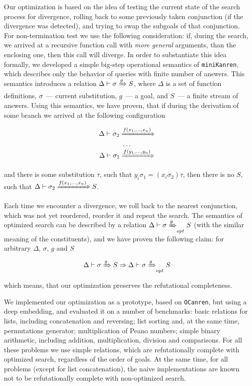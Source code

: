 \documentclass[preprint,numbers,10pt]{sigplanconf}
\newcommand{\miniKanren}{\texttt{miniKanren}\xspace}
\newcommand{\ocanren}{\texttt{OCanren}\xspace}
\begin{document}
Our optimization is based on the idea of testing the current state of the search process for divergence, rolling back to some previously taken conjunction
(if the divergence was detected), and trying to swap the subgoals of that conjunction. For non-termination test we use the following consideration: if, during
the search, we arrived at a recursive function call with \emph{more general} arguments, than the enclosing one, then this call will diverge. In order to substantiate
this idea formally, we developed a simple big-step operational semantics of \miniKanren, which describes only the behavior of queries with finite number of answers.
This semantics introduces a relation $\Delta\vdash\sigma\xRightarrow{g} S$, where $\Delta$ is a set of function definitions, $\sigma$~--- current substitution, 
$g$~--- a goal, and $S$~--- a finite stream of answers. Using this semantics, we have proven, that if during the derivation of some branch we arrived at the 
following configuration

$$
\begin{array}{c}
  \Delta\vdash\sigma_2\xRightarrow{f(x_1,\dots,x_n)}\\
  \ldots\\
  \Delta\vdash\sigma_1\xRightarrow{f(y_1,\dots,y_n)} 
\end{array}
$$

\noindent and there is some substitution $\tau$, such that $y_i\sigma_1=(x_i\sigma_2)\tau$, then there is no $S$, such that $\Delta\vdash\sigma_2\xRightarrow{f(x_1,\dots,x_n)} S$.

Each time we encounter a divergence, we roll back to the nearest conjunction, which was not yet reordered, reorder it and repeat the search. The semantics of optimized search 
can be described by a relation $\Delta\vdash\sigma\xRightarrow{g}_{opt} S$ (with the similar meaning of the constituents), and we have proven the following claim: for arbitrary
$\Delta$, $\sigma$, $g$ and $S$ 

$$\Delta\vdash\sigma\xRightarrow{g}S\Rightarrow\Delta\vdash\sigma\xRightarrow{g}_{opt} S$$

\noindent which means, that our optimization preserves the refutational completeness.

We implemented our optimization as a prototype, based on \ocanren, but using a deep embedding, and evaluated it on a number of benchmarks:
basic relations for lists, including concatenation and reversing; list sorting and, at the same time, permutations generator;
multiplication of Peano numbers; simple binary arithmetic, including addition, multiplication, division and comparisons. 
For all these problems we use simple relations, which are refutationally complete with optimized search, regardless of the order of goals. At the same time, 
for all problems (except for list concatenation), the naive implementations are known not to be refutationally complete with non-optimized search.
\end{document}
